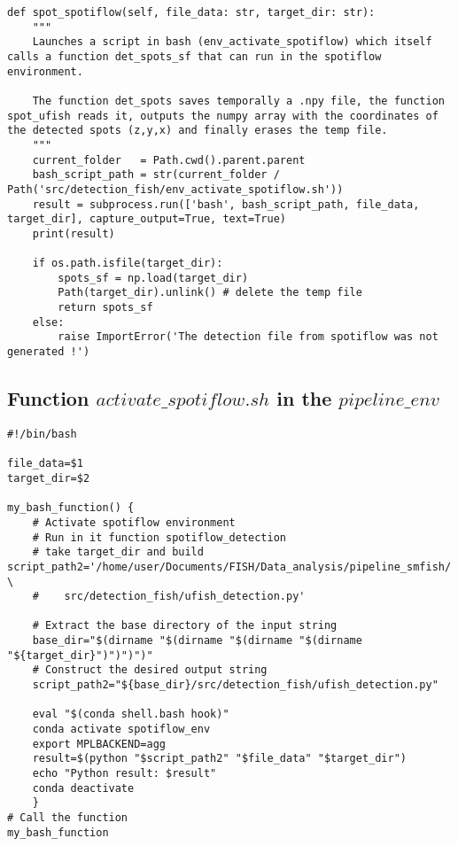 \documentclass[24pt]{article}
\begin{document}
\begin{lstlisting}
def spot_spotiflow(self, file_data: str, target_dir: str):
    """
    Launches a script in bash (env_activate_spotiflow) which itself calls a function det_spots_sf that can run in the spotiflow environment.
        
    The function det_spots saves temporally a .npy file, the function spot_ufish reads it, outputs the numpy array with the coordinates of the detected spots (z,y,x) and finally erases the temp file.
    """ 
    current_folder   = Path.cwd().parent.parent
    bash_script_path = str(current_folder /   Path('src/detection_fish/env_activate_spotiflow.sh'))                
    result = subprocess.run(['bash', bash_script_path, file_data,  target_dir], capture_output=True, text=True)
    print(result)
        
    if os.path.isfile(target_dir):
        spots_sf = np.load(target_dir)
        Path(target_dir).unlink() # delete the temp file
        return spots_sf
    else:
        raise ImportError('The detection file from spotiflow was not generated !') 
\end{lstlisting}
        


\subsection{Function $activate\_spotiflow.sh$ in the $pipeline\_env $}

\begin{lstlisting}
#!/bin/bash 

file_data=$1
target_dir=$2

my_bash_function() { 
    # Activate spotiflow environment
    # Run in it function spotiflow_detection
    # take target_dir and build script_path2='/home/user/Documents/FISH/Data_analysis/pipeline_smfish/  \
    #    src/detection_fish/ufish_detection.py'
    
    # Extract the base directory of the input string
    base_dir="$(dirname "$(dirname "$(dirname "$(dirname "${target_dir}")")")")"
    # Construct the desired output string
    script_path2="${base_dir}/src/detection_fish/ufish_detection.py"

    eval "$(conda shell.bash hook)"
    conda activate spotiflow_env
    export MPLBACKEND=agg
    result=$(python "$script_path2" "$file_data" "$target_dir")
    echo "Python result: $result"    
    conda deactivate
    } 
# Call the function 
my_bash_function
\end{lstlisting}
\end{document}
